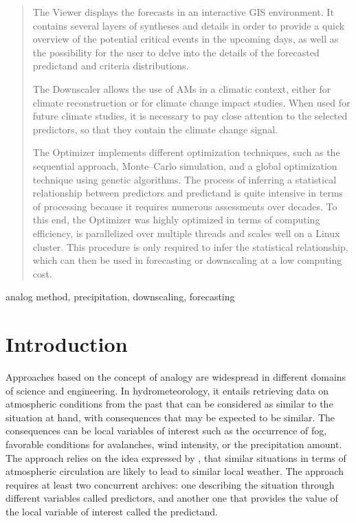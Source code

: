 \documentclass[review]{elsarticle}
\begin{document}
\begin{frontmatter}
\begin{abstract}
		The Viewer displays the forecasts in an interactive GIS environment. It contains several layers of syntheses and details in order to provide a quick overview of the potential critical events in the upcoming days, as well as the possibility for the user to delve into the details of the forecasted predictand and criteria distributions.
		
		The Downscaler allows the use of AMs in a climatic context, either for climate reconstruction or for climate change impact studies. When used for future climate studies, it is necessary to pay close attention to the selected predictors, so that they contain the climate change signal.
		
		The Optimizer implements different optimization techniques, such as the sequential approach, Monte--Carlo simulation, and a global optimization technique using genetic algorithms. The process of inferring a statistical relationship between predictors and predictand is quite intensive in terms of processing because it requires numerous assessments over decades. To this end, the Optimizer was highly optimized in terms of computing efficiency, is parallelized over multiple threads and scales well on a Linux cluster. This procedure is only required to infer the statistical relationship, which can then be used in forecasting or downscaling at a low computing cost.
		
		
	\end{abstract}
	
	\begin{keyword}
		analog method, precipitation, downscaling, forecasting
	\end{keyword}
	
\end{frontmatter}

\linenumbers


\section{Introduction}

Approaches based on the concept of analogy are widespread in different domains of science and engineering. In hydrometeorology, it entails retrieving data on atmospheric conditions from the past that can be considered as similar to the situation at hand, with consequences that may be expected to be similar. The consequences can be local variables of interest such as the occurrence of fog, favorable conditions for avalanches, wind intensity, or the precipitation amount. The approach relies on the idea expressed by \citet{Lorenz1956, Lorenz1969}, that similar situations in terms of atmospheric circulation are likely to lead to similar local weather. The approach requires at least two concurrent archives: one describing the situation through different variables called predictors, and another one that provides the value of the local variable of interest called the predictand. 
\end{document}
